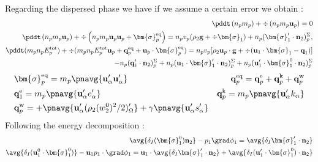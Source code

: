 Regarding the dispersed phase we have  if we assume a certain error we obtain :
\begin{align*}
    \pddt \left(n_p m_p\right)
    + \div \left(n_pm_p\textbf{u}_p
    \right)
    = 
    0\\
    \pddt \left(n_p m_p \textbf{u}_p\right)
    + \div \left(n_p
    m_p \textbf{u}_p \textbf{u}_p 
    + \bm{\sigma}_p^\text{eq}
    \right)
    = 
    n_p v_p (\rho_2 \textbf{g}
    + \div \bm{\sigma}_1)
    + n_p (\bm{\sigma}_1' \cdot \textbf{n}_2)_p^\Sigma,\\
    \pddt(m_p n_pE_p^\text{tot})
    + \div(m_pn_p E_p^\text{tot} \textbf{u}_p 
    + \textbf{q}_p^\text{eq} 
    + \textbf{u}_p \cdot \bm{\sigma}_p^\text{eq})
    =  n_p v_p [\rho_2 \textbf{u}_p\cdot  \textbf{g}
    + \div (\textbf{u}_1 \cdot \bm{\sigma}_1 - \textbf{q}_1)]\\
    -  n_p (\textbf{q}_1' \cdot \textbf{n}_2)_p^\Sigma
    +  n_p (\textbf{u}_1 \cdot \bm{\sigma}_1' \cdot \textbf{n}_2)_p^\Sigma
    +  n_p (\textbf{u}_1' \cdot \bm{\sigma}_1^0\cdot \textbf{n}_2)_p^\Sigma
\end{align*}
\begin{align*}
    &\bm{\sigma}_p^\text{eq}
    = m_p\pnavg{\textbf{u}_\alpha'\textbf{u}_\alpha'}
    &\textbf{q}_p^\text{eq}
    =\textbf{q}_p^\text{e} 
    +\textbf{q}_p^\text{k}  
    +\textbf{q}_p^\text{w}  
    \\
    &\textbf{q}_1^\text{e}
    = m_p \pnavg{\textbf{u}_\alpha' e_\alpha'} 
    &\textbf{q}_p^\text{k}
    = m_p \pnavg{\textbf{u}_\alpha' k_\alpha} 
    \\
    &\textbf{q}_p^\text{w}
    = 
    + \pnavg{\textbf{u}_\alpha'(\rho_2 (w^0_2)^2/2 )'_\Omega}
    + \gamma \pnavg{\textbf{u}_\alpha' s_\alpha'}
\end{align*}
Following the energy decomposition : 
\begin{align*}
    \avg{\delta_I (\bm{\sigma}_1^0 ) \textbf{n}_2} - p_1 \grad \phi_1
    = 
    \avg{\delta_I \bm{\sigma}_1'\cdot \textbf{n}_2}
    \\
    \avg{\delta_I (\textbf{u}_1^0 \cdot\bm{\sigma}_1^0 )} - \textbf{u}_1p_1\cdot \grad \phi_1
    = \textbf{u}_1 \cdot \avg{\delta_I \bm{\sigma}_1'\cdot \textbf{n}_2}
    + \avg{\delta_I (\textbf{u}_1' \cdot \bm{\sigma}_1^0 )\cdot \textbf{n}_2}
\end{align*}

